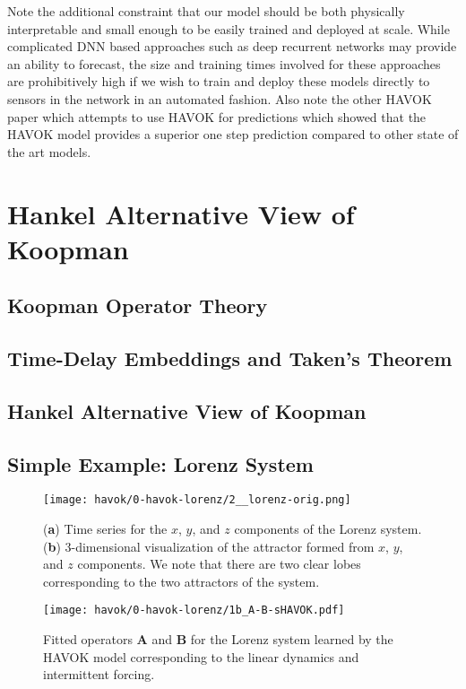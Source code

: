 Note the additional constraint that our model should be both physically
interpretable and small enough to be easily trained and deployed at scale. While
complicated DNN based approaches such as deep recurrent networks may provide an
ability to forecast, the size and training times involved for these approaches
are prohibitively high if we wish to train and deploy these models directly to
sensors in the network in an automated fashion. Also note the other HAVOK paper
which attempts to use HAVOK for predictions which showed that the HAVOK model
provides a superior one step prediction compared to other state of the art
models.


\section{Hankel Alternative View of Koopman}

\subsection{Koopman Operator Theory}

\subsection{Time-Delay Embeddings and Taken's Theorem}

\subsection{Hankel Alternative View of Koopman}


\subsection{Simple Example: Lorenz System}


\begin{figure}[h]
  \centering
  \texttt{[image: havok/0-havok-lorenz/2\_\_lorenz-orig.png]}
  \caption{(\textbf{a}) Time series for the $x$, $y$, and $z$ components of the
    Lorenz system. (\textbf{b}) 3-dimensional visualization of the attractor
    formed from $x$, $y$, and $z$ components. We note that there are two clear
    lobes corresponding to the two attractors of the system.}
  \label{fig:lorenz-time-series-orig}
\end{figure}


\begin{figure}[h]
  \centering
  \texttt{[image: havok/0-havok-lorenz/1b\_A-B-sHAVOK.pdf]}
  \caption{Fitted operators $\mathbf{A}$ and $\mathbf{B}$ for the Lorenz system
    learned by the HAVOK model corresponding to the linear dynamics and
    intermittent forcing.}
  \label{fig:lorenz-A-B-heatmap}
\end{figure}



